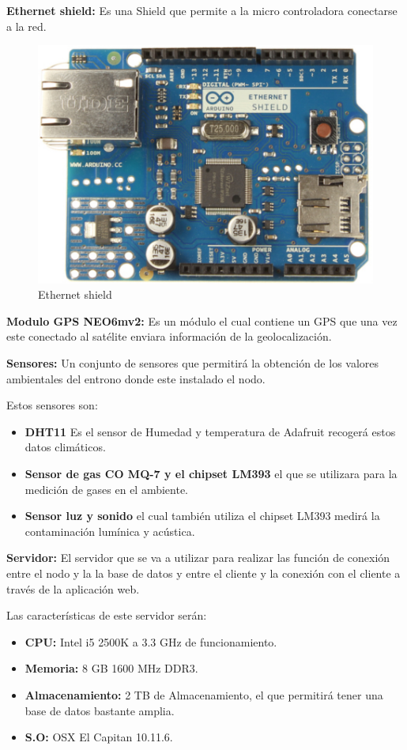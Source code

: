 \setlength{\parindent}{0ex}\textbf{Ethernet shield:} Es una Shield que permite a la micro controladora conectarse a la red.

\begin{figure}[!h]
	\centering
	\includegraphics[width=0.3\linewidth]{figuras/ethshi}
	\caption{Ethernet shield}
	\label{fig:imgethshi}
\end{figure}

\setlength{\parindent}{0ex}\textbf{Modulo GPS NEO6mv2: }Es un módulo el cual contiene un GPS que una vez este conectado al satélite enviara información de la geolocalización.

\setlength{\parindent}{0ex}\textbf{Sensores:} Un conjunto de sensores que permitirá la obtención de los valores ambientales del entrono donde este instalado el nodo.

Estos sensores son:

\begin{itemize}
	\item \textbf{DHT11} Es el sensor de Humedad y temperatura de Adafruit recogerá estos datos climáticos.
	\item \textbf{Sensor de gas CO MQ-7 y el chipset LM393} el que se utilizara para la medición de gases en el ambiente.
	\item \textbf{Sensor luz y sonido} el cual también utiliza el chipset LM393 medirá la contaminación lumínica y acústica.
\end{itemize}

\textbf{Servidor:} El servidor que se va a utilizar para realizar las función de conexión entre el nodo y la la base de datos y entre el cliente y la conexión con el cliente a través de la aplicación web.

Las características de este servidor serán:

\begin{itemize}
	\item \textbf{CPU:} Intel i5 2500K a 3.3 GHz de funcionamiento.
	\item \textbf{Memoria:} 8 GB 1600 MHz DDR3.
	\item \textbf{Almacenamiento:} 2 TB de Almacenamiento, el que permitirá tener una base de datos bastante amplia.
	\item \textbf{S.O:} OSX El Capitan 10.11.6.
\end{itemize}

